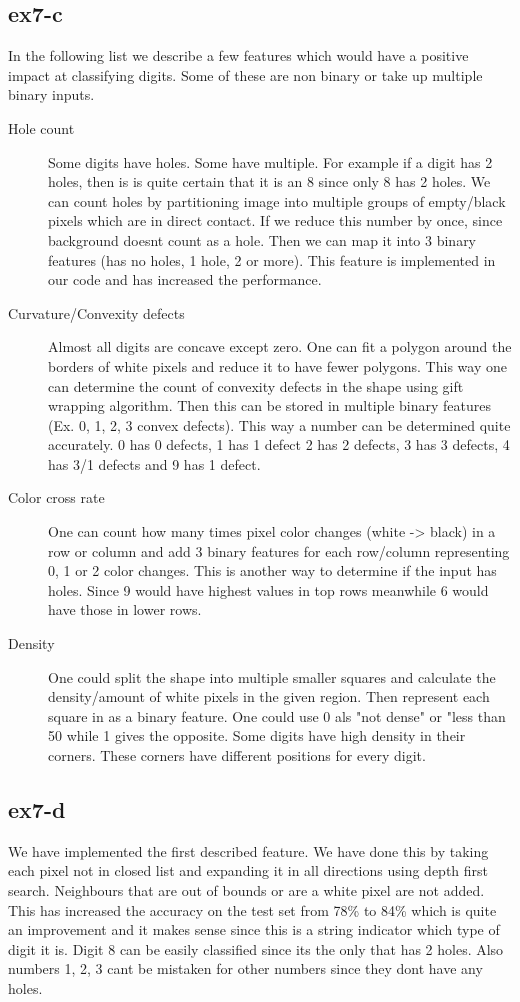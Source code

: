 \subsection{ex7-c}
In the following list we describe a few features which would have a positive impact at classifying digits. Some of these
are non binary or take up multiple binary inputs.
\begin{description}
\item[Hole count] Some digits have holes. Some have multiple. For example if a digit has 2 holes, then is is quite
certain that it is an 8 since only 8 has 2 holes. We can count holes by partitioning image into multiple groups of
empty/black pixels which are in direct contact. If we reduce this number by once, since background doesnt count as a
hole. Then we can map it into 3 binary features (has no holes, 1 hole, 2 or more). This feature is implemented in our
code and has increased the performance.

\item[Curvature/Convexity defects] Almost all digits are concave except zero. One can fit a polygon around the borders of white pixels
and reduce it to have fewer polygons. This way one can determine the count of convexity defects in the shape using
gift wrapping algorithm. Then this can be stored in multiple binary features (Ex. 0, 1, 2, 3 convex defects). This way
a number can be determined quite accurately. 0 has 0 defects, 1 has 1 defect 2 has 2 defects, 3 has 3 defects, 4 has
3/1 defects and 9 has 1 defect.

\item[Color cross rate] One can count how many times pixel color changes (white -> black) in a row or column and add 3
binary features for each row/column representing 0, 1 or 2 color changes. This is another way to determine if the input
has holes. Since 9 would have highest values in top rows meanwhile 6 would have those in lower rows.

\item[Density] One could split the shape into multiple smaller squares and calculate the density/amount of white pixels
in the given region. Then represent each square in as a binary feature. One could use 0 als "not dense" or "less than 50%
while 1 gives the opposite. Some digits have high density in their corners. These corners have different positions for every digit.
\end{description}

\subsection{ex7-d}
We have implemented the first described feature. We have done this by taking each pixel not in closed list and expanding
it in all directions using depth first search. Neighbours that are out of bounds or are a white pixel are not added.\\
This has increased the accuracy on the test set from 78\% to 84\% which is quite an improvement and it makes sense since
this is a string indicator which type of digit it is. Digit 8 can be easily classified since its the only that has 2
holes. Also numbers 1, 2, 3 cant be mistaken for other numbers since they dont have any holes.
